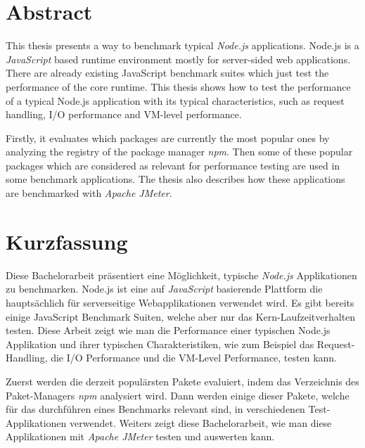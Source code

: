 \chapter*{Abstract}
This thesis presents a way to benchmark typical \textit{Node.js} applications. Node.js is a \textit{JavaScript} based runtime environment mostly for server-sided web applications. There are already existing JavaScript benchmark suites which just test the performance of the core runtime. This thesis shows how to test the performance of a typical Node.js application with its typical characteristics, such as request handling, I/O performance and VM-level performance. 

Firstly, it evaluates which packages are currently the most popular ones by analyzing the registry of the package manager \textit{npm}.
Then some of these popular packages which are considered as relevant for performance testing are used in some benchmark applications. The thesis also describes how these applications are benchmarked with \textit{Apache JMeter}.



\newpage

\chapter*{Kurzfassung}
Diese Bachelorarbeit pr\"asentiert eine M\"oglichkeit, typische \textit{Node.js} Applikationen zu benchmarken. Node.js ist eine auf \textit{JavaScript} basierende Plattform die haupts\"achlich f\"ur serverseitige Webapplikationen verwendet wird. Es gibt bereits einige JavaScript Benchmark Suiten, welche aber nur das Kern-Laufzeitverhalten testen. Diese Arbeit zeigt wie man die Performance einer typischen Node.js Applikation und ihrer typischen Charakteristiken, wie zum Beispiel das Request-Handling, die I/O Performance und die VM-Level Performance, testen kann.

Zuerst werden die derzeit popul\"arsten Pakete evaluiert, indem das Verzeichnis des Paket-Managers \textit{npm} analysiert wird. Dann werden einige dieser Pakete, welche f\"ur das durchf\"uhren eines Benchmarks relevant sind, in verschiedenen Test-Applikationen verwendet. Weiters zeigt diese Bachelorarbeit, wie man diese Applikationen mit \textit{Apache JMeter} testen und auswerten kann.


\newpage